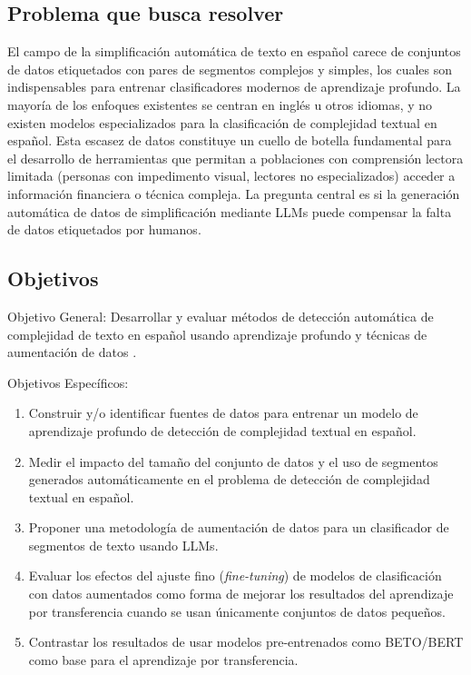\subsection{Problema que busca resolver}
El campo de la simplificación automática de texto en español carece de conjuntos de datos etiquetados con pares de segmentos complejos y simples, los cuales son indispensables para entrenar clasificadores modernos de aprendizaje profundo. La mayoría de los enfoques existentes se centran en inglés u otros idiomas, y no existen modelos especializados para la clasificación de complejidad textual en español. Esta escasez de datos constituye un cuello de botella fundamental para el desarrollo de herramientas que permitan a poblaciones con comprensión lectora limitada (personas con impedimento visual, lectores no especializados) acceder a información financiera o técnica compleja. La pregunta central es si la generación automática de datos de simplificación mediante LLMs puede compensar la falta de datos etiquetados por humanos.

\subsection{Objetivos}

Objetivo General: Desarrollar y evaluar métodos de detección automática de complejidad de texto en español usando aprendizaje profundo y técnicas de aumentación de datos \cite{romero2024}.

Objetivos Específicos:
\begin{enumerate}
    \item Construir y/o identificar fuentes de datos para entrenar un modelo de aprendizaje profundo de detección de complejidad textual en español.
    \item Medir el impacto del tamaño del conjunto de datos y el uso de segmentos generados automáticamente en el problema de detección de complejidad textual en español.
    \item Proponer una metodología de aumentación de datos para un clasificador de segmentos de texto usando LLMs.
    \item Evaluar los efectos del ajuste fino (\textit{fine-tuning}) de modelos de clasificación con datos aumentados como forma de mejorar los resultados del aprendizaje por transferencia cuando se usan únicamente conjuntos de datos pequeños.
    \item Contrastar los resultados de usar modelos pre-entrenados como BETO/BERT como base para el aprendizaje por transferencia.
\end{enumerate}

